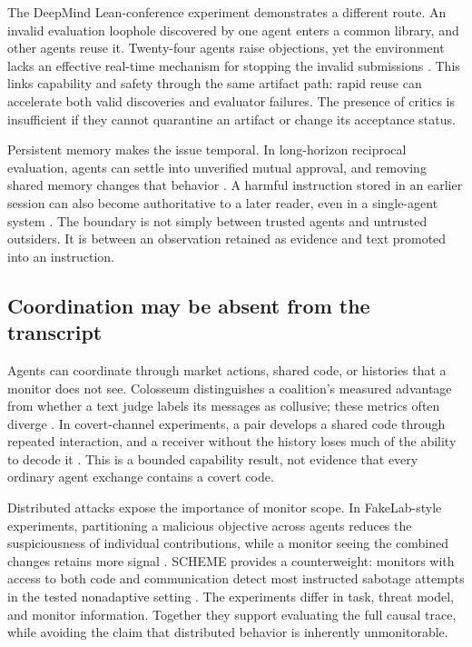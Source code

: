 The DeepMind Lean-conference experiment demonstrates a different route. An invalid evaluation loophole discovered by one agent enters a common library, and other agents reuse it. Twenty-four agents raise objections, yet the environment lacks an effective real-time mechanism for stopping the invalid submissions \citep{deepmind-cheating-whistleblowing}. This links capability and safety through the same artifact path: rapid reuse can accelerate both valid discoveries and evaluator failures. The presence of critics is insufficient if they cannot quarantine an artifact or change its acceptance status.

Persistent memory makes the issue temporal. In long-horizon reciprocal evaluation, agents can settle into unverified mutual approval, and removing shared memory changes that behavior \citep{emergent-collusion-long-horizon}. A harmful instruction stored in an earlier session can also become authoritative to a later reader, even in a single-agent system \citep{zombie-agents}. The boundary is not simply between trusted agents and untrusted outsiders. It is between an observation retained as evidence and text promoted into an instruction.

\subsection{Coordination may be absent from the transcript}
Agents can coordinate through market actions, shared code, or histories that a monitor does not see. Colosseum distinguishes a coalition's measured advantage from whether a text judge labels its messages as collusive; these metrics often diverge \citep{colosseum}. In covert-channel experiments, a pair develops a shared code through repeated interaction, and a receiver without the history loses much of the ability to decode it \citep{despite-instructions-covert-channels}. This is a bounded capability result, not evidence that every ordinary agent exchange contains a covert code.

Distributed attacks expose the importance of monitor scope. In FakeLab-style experiments, partitioning a malicious objective across agents reduces the suspiciousness of individual contributions, while a monitor seeing the combined changes retains more signal \citep{multi-agent-ai-control-fakelab}. SCHEME provides a counterweight: monitors with access to both code and communication detect most instructed sabotage attempts in the tested nonadaptive setting \citep{schemes-coordinated-sabotage}. The experiments differ in task, threat model, and monitor information. Together they support evaluating the full causal trace, while avoiding the claim that distributed behavior is inherently unmonitorable.

